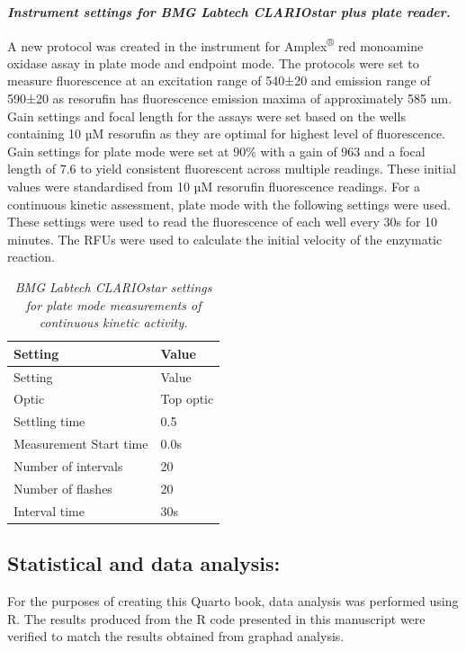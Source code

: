 \documentclass[
  letterpaper,
  DIV=11,
  numbers=noendperiod]{scrreprt}
\begin{document}
\textbf{\emph{Instrument settings for BMG Labtech CLARIOstar plus plate
reader.}}

A new protocol was created in the instrument for
Amplex\textsuperscript{®} red monoamine oxidase assay in plate mode and
endpoint mode. The protocols were set to measure fluorescence at an
excitation range of 540±20 and emission range of 590±20 as resorufin has
fluorescence emission maxima of approximately 585 nm. Gain settings and
focal length for the assays were set based on the wells containing 10 µM
resorufin as they are optimal for highest level of fluorescence.~ Gain
settings for plate mode were set at 90\% with a gain of 963 and a focal
length of 7.6 to yield consistent fluorescent across multiple readings.
These initial values were standardised from 10 µM resorufin fluorescence
readings. For a continuous kinetic assessment, plate mode with the
following settings were used. These settings were used to read the
fluorescence of each well every 30s for 10 minutes. The RFUs were used
to calculate the initial velocity of the enzymatic reaction.

\begin{longtable}[]{@{}ll@{}}
\caption{\emph{BMG Labtech CLARIOstar settings for plate mode
measurements of continuous kinetic
activity.}}\label{tbl-clairostar-instrument-setting}\tabularnewline
\toprule\noalign{}
Setting & Value \\
\midrule\noalign{}
\endfirsthead
\toprule\noalign{}
Setting & Value \\
\midrule\noalign{}
\endhead
\bottomrule\noalign{}
\endlastfoot
Optic & Top optic \\
Settling time & 0.5 \\
Measurement Start time & 0.0s \\
Number of intervals & 20 \\
Number of flashes & 20 \\
Interval time & 30s \\
\end{longtable}

\subsection{\texorpdfstring{\textbf{Statistical and data
analysis:}}{Statistical and data analysis:}}\label{statistical-and-data-analysis}

For the purposes of creating this Quarto book, data analysis was
performed using R. The results produced from the R code presented in
this manuscript were verified to match the results obtained from graphad
analysis.
\end{document}
